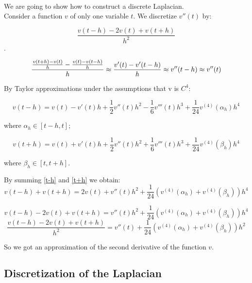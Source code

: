We are going to show how to construct a discrete Laplacian.\\


Consider a function $v$ of only one variable $t$. We discretize $v''(t)$ by:

\begin{equation}
\frac{v(t - h) - 2 v(t) + v(t + h)}{h^2}
\end{equation}
.


\begin{equation}
\frac{\frac{v(t + h) - v(t)}{h} - \frac{v(t) - v(t - h)}{h}}{h} \approx\\
\frac{v'(t) - v'(t-h)}{h} \approx\\
v''(t-h) \approx v''(t)
\end{equation}

By Taylor approximations under the assumptions that v is $C^4$:

\begin{equation}
v(t-h) = v(t) - v'(t) h + \frac{1}{2} v''(t) h^2 - \frac{1}{6} v'''(t) h^3 + \frac{1}{24} v^{(4)}(\alpha_h) h^4
\label{t-h}
\end{equation}

where $\alpha_h \in [t-h, t]$;

\begin{equation}
v(t+h) = v(t) + v'(t) h + \frac{1}{2} v''(t) h^2 + \frac{1}{6} v'''(t) h^3 + \frac{1}{24} v^{(4)}(\beta_h) h^4
\label{t+h}
\end{equation}

where $\beta_h \in [t, t+h]$.

By summing \ref{t-h} and \ref{t+h} we obtain:
\begin{equation}
v(t-h) + v(t+h) = 2 v(t) + v''(t) h^2 + \frac{1}{24} (v^{(4)}(\alpha_h) + v^{(4)}(\beta_h)) h^4
\end{equation}

\begin{equation}
v(t-h) - 2 v(t) + v(t+h) = v''(t) h^2 + \frac{1}{24} (v^{(4)}(\alpha_h) + v^{(4)}(\beta_h)) h^4
\end{equation}
\begin{equation}
\frac{v(t-h) - 2 v(t) + v(t+h)}{h^2} = v''(t) + \frac{1}{24} (v^{(4)}(\alpha_h) + v^{(4)}(\beta_h)) h^2
\end{equation}

So we got an approximation of the second derivative of the function $v$.

\subsection{Discretization of the Laplacian}

